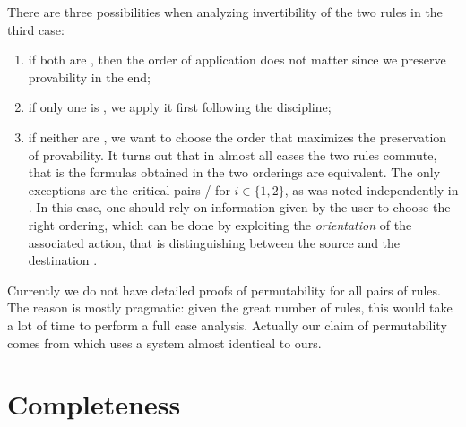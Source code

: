 \begin{scope}
There are three possibilities when analyzing invertibility of the two rules in
the third case:
\begin{enumerate}
  \item if both are , then the order of application does not matter
  since we preserve provability in the end;
  \item if only one is , we apply it first following the 
  discipline;
  \item if neither are , we want to choose the order that
  maximizes the preservation of provability. It turns out that in almost all
  cases the two rules commute, that is the formulas obtained in the two
  orderings are equivalent. The only exceptions are the critical pairs
  / for $i \in \{1,2\}$, as was noted
  independently in . In this case, one
  should rely on information given by the user to choose the right ordering,
  which can be done by exploiting the \emph{orientation} of the associated
   action, that is distinguishing between the source  and the
  destination .
\end{enumerate}

\begin{remark}
Currently we do not have detailed proofs of permutability for all pairs of
rules. The reason is mostly pragmatic: given the great number of rules, this
would take a lot of time to perform a full case analysis. Actually our claim of
permutability comes from \cite{DBLP:conf/cade/Chaudhuri21} which uses a
 system almost identical to ours.
\end{remark}

\section{Completeness}


\end{scope}
